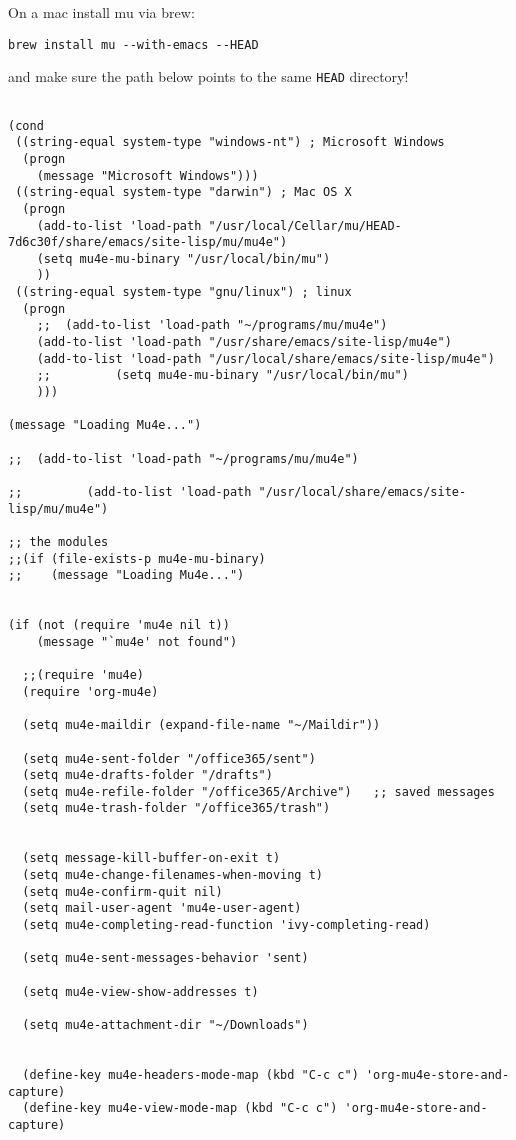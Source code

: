 \documentclass[12pt]{article}
\begin{document}
On a mac install mu via brew:

\begin{verbatim}
brew install mu --with-emacs --HEAD
\end{verbatim}

and make sure the path below points to the same \texttt{HEAD} directory!

\begin{verbatim}

(cond
 ((string-equal system-type "windows-nt") ; Microsoft Windows
  (progn
    (message "Microsoft Windows")))
 ((string-equal system-type "darwin") ; Mac OS X
  (progn
    (add-to-list 'load-path "/usr/local/Cellar/mu/HEAD-7d6c30f/share/emacs/site-lisp/mu/mu4e")
    (setq mu4e-mu-binary "/usr/local/bin/mu")
    ))
 ((string-equal system-type "gnu/linux") ; linux
  (progn
    ;;  (add-to-list 'load-path "~/programs/mu/mu4e")
    (add-to-list 'load-path "/usr/share/emacs/site-lisp/mu4e")
    (add-to-list 'load-path "/usr/local/share/emacs/site-lisp/mu4e")   
    ;;         (setq mu4e-mu-binary "/usr/local/bin/mu")
    )))

(message "Loading Mu4e...")

;;  (add-to-list 'load-path "~/programs/mu/mu4e")

;;         (add-to-list 'load-path "/usr/local/share/emacs/site-lisp/mu/mu4e")   

;; the modules
;;(if (file-exists-p mu4e-mu-binary)
;;    (message "Loading Mu4e...")


(if (not (require 'mu4e nil t))
    (message "`mu4e' not found")

  ;;(require 'mu4e)
  (require 'org-mu4e)

  (setq mu4e-maildir (expand-file-name "~/Maildir"))

  (setq mu4e-sent-folder "/office365/sent")
  (setq mu4e-drafts-folder "/drafts")
  (setq mu4e-refile-folder "/office365/Archive")   ;; saved messages
  (setq mu4e-trash-folder "/office365/trash")


  (setq message-kill-buffer-on-exit t)
  (setq mu4e-change-filenames-when-moving t)
  (setq mu4e-confirm-quit nil)
  (setq mail-user-agent 'mu4e-user-agent)
  (setq mu4e-completing-read-function 'ivy-completing-read)

  (setq mu4e-sent-messages-behavior 'sent)

  (setq mu4e-view-show-addresses t)

  (setq mu4e-attachment-dir "~/Downloads")


  (define-key mu4e-headers-mode-map (kbd "C-c c") 'org-mu4e-store-and-capture)
  (define-key mu4e-view-mode-map (kbd "C-c c") 'org-mu4e-store-and-capture)


\end{verbatim}
\end{document}
